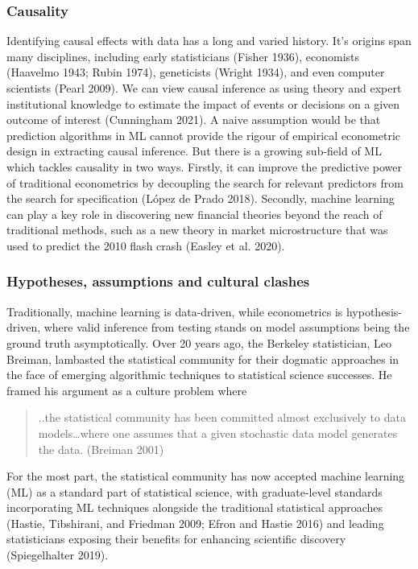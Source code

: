 \documentclass{article}
\begin{document}
\hypertarget{causality}{%
\subsubsection{Causality}\label{causality}}

Identifying causal effects with data has a long and varied history. It's
origins span many disciplines, including early statisticians (Fisher
1936), economists (Haavelmo 1943; Rubin 1974), geneticists (Wright
1934), and even computer scientists (Pearl 2009). We can view causal
inference as using theory and expert institutional knowledge to estimate
the impact of events or decisions on a given outcome of interest
(Cunningham 2021). A naive assumption would be that prediction
algorithms in ML cannot provide the rigour of empirical econometric
design in extracting causal inference. But there is a growing sub-field
of ML which tackles causality in two ways. Firstly, it can improve the
predictive power of traditional econometrics by decoupling the search
for relevant predictors from the search for specification (López de
Prado 2018). Secondly, machine learning can play a key role in
discovering new financial theories beyond the reach of traditional
methods, such as a new theory in market microstructure that was used to
predict the 2010 flash crash (Easley et al. 2020).

\hypertarget{hypotheses-assumptions-and-cultural-clashes}{%
\subsubsection{Hypotheses, assumptions and cultural
clashes}\label{hypotheses-assumptions-and-cultural-clashes}}

Traditionally, machine learning is data-driven, while econometrics is
hypothesis-driven, where valid inference from testing stands on model
assumptions being the ground truth asymptotically. Over 20 years ago,
the Berkeley statistician, Leo Breiman, lambasted the statistical
community for their dogmatic approaches in the face of emerging
algorithmic techniques to statistical science successes. He framed his
argument as a culture problem where

\begin{quote}
..the statistical community has been committed almost exclusively to
data models\ldots where one assumes that a given stochastic data model
generates the data. (Breiman 2001)
\end{quote}

For the most part, the statistical community has now accepted machine
learning (ML) as a standard part of statistical science, with
graduate-level standards incorporating ML techniques alongside the
traditional statistical approaches (Hastie, Tibshirani, and Friedman
2009; Efron and Hastie 2016) and leading statisticians exposing their
benefits for enhancing scientific discovery (Spiegelhalter 2019).
\end{document}
